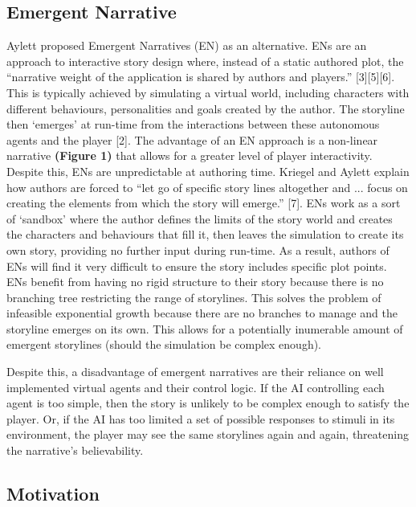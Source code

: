 \documentclass{sig-alternate-05-2015}
\begin{document}
\subsection{Emergent Narrative}

Aylett proposed Emergent Narratives (EN) as an alternative. ENs are an approach to interactive story design where, instead of a static authored plot, the ``narrative weight of the application is shared by authors and players.'' [3][5][6]. This is typically achieved by simulating a virtual world, including characters with different behaviours, personalities and goals created by the author. The storyline then `emerges' at run-time from the interactions between these autonomous agents and the player [2]. The advantage of an EN approach is a non-linear narrative \textbf{(Figure 1)} that allows for a greater level of player interactivity. Despite this, ENs are unpredictable at authoring time. Kriegel and Aylett explain how authors are forced to ``let go of specific story lines altogether and ... focus on creating the elements from which the story will emerge.'' [7]. ENs work as a sort of `sandbox' where the author defines the limits of the story world and creates the characters and behaviours that fill it, then leaves the simulation to create its own story, providing no further input during run-time. As a result, authors of ENs will find it very difficult to ensure the story includes specific plot points. \\

ENs benefit from having no rigid structure to their story because there is no branching tree restricting the range of storylines. This solves the problem of infeasible exponential growth because there are no branches to manage and the storyline emerges on its own. This allows for a potentially inumerable amount of emergent storylines (should the simulation be complex enough).

Despite this, a disadvantage of emergent narratives are their reliance on well implemented virtual agents and their control logic. If the AI controlling each agent is too simple, then the story is unlikely to be complex enough to satisfy the player. Or, if the AI has too limited a set of possible responses to stimuli in its environment, the player may see the same storylines again and again, threatening the narrative's believability.

\subsection{Motivation}
\end{document}
